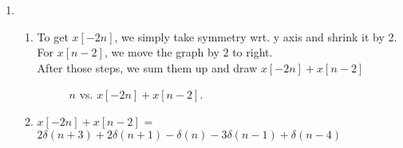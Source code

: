 \documentclass[10pt,a4paper, margin=1in]{article}
\begin{document}
\begin{enumerate}
\begin{filecontents}{fig3.dat}
 n   xn
 -4  0
 -3  2
 -2  0  
 -1  2
  0  -1
 1   -3 
 2   0
 3   0
 4   1
\end{filecontents}

\newpage
\item %
    \begin{enumerate}
    \item To get $x[-2n]$, we simply take symmetry wrt. y axis and shrink it by 2.\\
    For $x[n-2]$, we move the graph by 2 to right.\\
    After those steps, we sum them up and draw $x[-2n] + x[n-2]$\\
        \begin{figure}[h!]
            \centering
            \caption{$n$ vs. $x[-2n] + x[n-2]$.}
            \label{fig:fig2}
        \end{figure}
    \item $x[-2n] + x[n-2]$ = $2\delta(n+3) + 2\delta(n+1) - \delta(n) -3\delta(n-1) + \delta(n-4)$
    \end{enumerate}


\end{enumerate}
\end{document}
